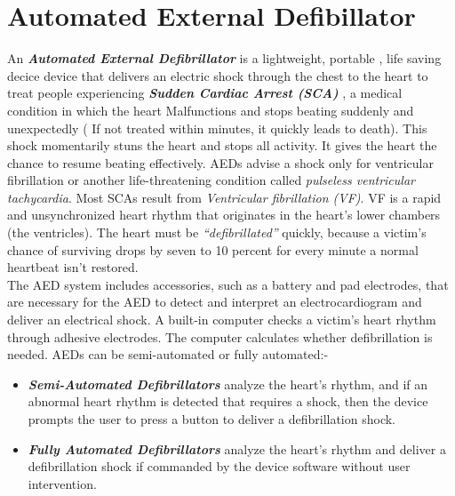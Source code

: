 \documentclass[12pt]{article}
\begin{document}
\section{Automated External Defibillator}
An \textbf{ \emph{Automated External Defibrillator  }} is a lightweight, portable , life saving decice  device that delivers an electric shock through the chest to the heart to treat people experiencing \textbf{ \emph{Sudden Cardiac Arrest (SCA)}
}, a medical condition in which the heart Malfunctions and stops beating suddenly and unexpectedly ( If not treated within minutes, it quickly leads to death).\newline
 This shock momentarily stuns the heart and stops all activity. It gives the heart the chance to resume beating effectively. AEDs advise a shock only for ventricular fibrillation or another life-threatening condition called \emph{ pulseless ventricular tachycardia}.\newline
 Most SCAs result from \emph{ Ventricular fibrillation (VF)}. VF is a rapid and unsynchronized heart rhythm that originates in the heart’s lower chambers (the ventricles). The heart must be \emph{“defibrillated”} quickly, because a victim’s chance of surviving drops by seven to 10 percent for every minute a normal heartbeat isn’t restored.\newline \\
 The AED system includes accessories, such as a battery and pad electrodes, that are necessary for the AED to detect and interpret an electrocardiogram and deliver an electrical shock. A built-in computer checks a victim’s heart rhythm through adhesive electrodes. The computer calculates whether defibrillation is needed. \newlinw
AEDs can be semi-automated or fully automated:- \newline
\begin{itemize}
\item  \textbf{\emph{Semi-Automated Defibrillators}} analyze the heart's rhythm, and if an abnormal heart rhythm is detected that requires a shock, then the device prompts the user to press a button to deliver a defibrillation shock. \newline
\item \textbf{\emph{Fully Automated Defibrillators}} analyze the heart's rhythm and deliver a defibrillation shock if commanded by the device software without user intervention.
\end{itemize}
\newline\\
\end{document}
